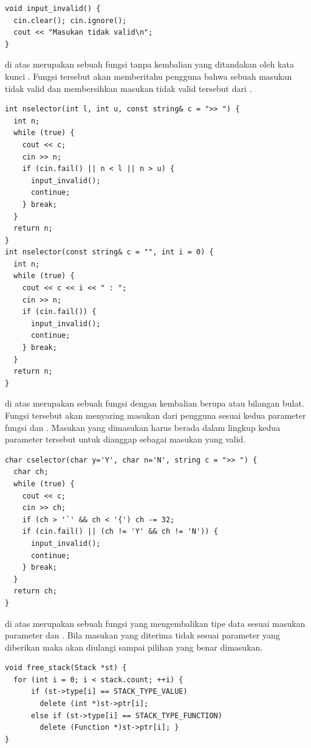 \documentclass[../main.tex]{subfiles}
\begin{document}
\begin{code}
\begin{verbatim}
void input_invalid() {
  cin.clear(); cin.ignore();
  cout << "Masukan tidak valid\n";
}
\end{verbatim}
\end{code}

{\Script} di atas merupakan sebuah fungsi tanpa kembalian yang ditandakan oleh kata kunci . Fungsi tersebut akan memberitahu pengguna bahwa sebuah masukan tidak valid dan membersihkan masukan tidak valid tersebut dari {\ioi} {\stream}.

\begin{code}
\begin{verbatim}
int nselector(int l, int u, const string& c = ">> ") {
  int n;
  while (true) {
    cout << c;
    cin >> n;
    if (cin.fail() || n < l || n > u) {
      input_invalid();
      continue;
    } break;
  }
  return n;
}
int nselector(const string& c = "", int i = 0) {
  int n;
  while (true) {
    cout << c << i << " : ";
    cin >> n;
    if (cin.fail()) {
      input_invalid();
      continue;
    } break;
  }
  return n;
}
\end{verbatim}
\end{code}

{\Script} di atas merupakan sebuah fungsi dengan kembalian berupa  atau bilangan bulat. Fungsi tersebut akan menyaring masukan dari pengguna sesuai kedua parameter fungsi  dan . Masukan yang dimasukan harus berada dalam lingkup kedua parameter tersebut untuk dianggap sebagai masukan yang valid.

\begin{code}
\begin{verbatim}
char cselector(char y='Y', char n='N', string c = ">> ") {
  char ch;
  while (true) {
    cout << c;
    cin >> ch;
    if (ch > '`' && ch < '{') ch -= 32;
    if (cin.fail() || (ch != 'Y' && ch != 'N')) {
      input_invalid();
      continue;
    } break;
  }
  return ch;
}
\end{verbatim}
\end{code}

{\Script} di atas merupakan sebuah fungsi yang mengembalikan tipe data  sesuai masukan parameter  dan . Bila masukan yang diterima tidak sesuai parameter yang diberikan maka akan diulangi sampai pilihan yang benar dimasukan.

\begin{code}
\begin{verbatim}
void free_stack(Stack *st) {
  for (int i = 0; i < stack.count; ++i) {
      if (st->type[i] == STACK_TYPE_VALUE)
        delete (int *)st->ptr[i];
      else if (st->type[i] == STACK_TYPE_FUNCTION)
        delete (Function *)st->ptr[i]; }
}
\end{verbatim}
\end{code}
\end{document}
